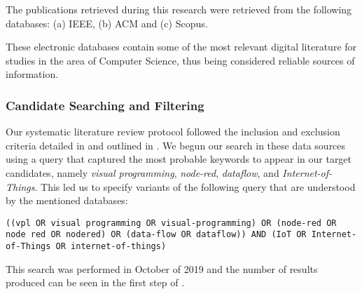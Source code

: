 The publications retrieved during this research were retrieved from the following databases: (a) IEEE, (b) ACM and (c) Scopus.

These electronic databases contain some of the most relevant digital literature for studies in the area of Computer Science, thus being considered reliable sources of information. 

\subsubsection{Candidate Searching and Filtering}\label{sec:process}

Our systematic literature review protocol followed the inclusion and exclusion criteria detailed in  and outlined in . We begun our search in these data sources using a query that captured the most probable keywords to appear in our target candidates, namely \emph{visual programming}, \emph{node-red}, \emph{dataflow}, and \emph{Internet-of-Things}. This led us to specify variants of the following query that are understood by the mentioned databases:

\noindent
\begin{lstlisting}[frame=none, numbers=none, backgroundcolor=\color{white},]
((vpl OR visual programming OR visual-programming) OR (node-red OR node red OR nodered) OR (data-flow OR dataflow)) AND (IoT OR Internet-of-Things OR internet-of-things)
\end{lstlisting}

This search was performed in October of 2019 and the number of results produced can be seen in the first step of . 

